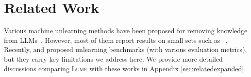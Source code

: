\section{Related Work}
Various machine unlearning methods have been proposed for removing knowledge from LLMs~\cite{zhang2024negativepreferenceoptimizationcatastrophic,pawelczyk2023context,chen-yang-2023-unlearn}. However, most of them report results on small sets such as ~\cite{eldan2023whosharrypotterapproximate}. Recently, \cite{maini2024tofu} and \cite{shi2024musemachineunlearningsixway} proposed unlearning benchmarks (with various evaluation metrics), but they carry key limitations we address here. We provide more detailed discussions comparing \textsc{Lume} with these works in Appendix \ref{sec:relatedexpanded}.